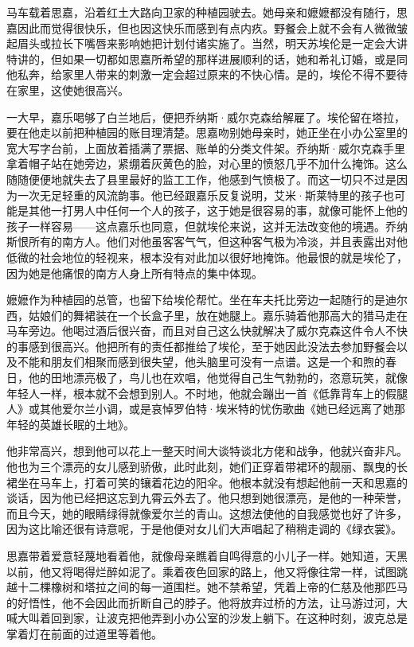 \par  
\par 马车载着思嘉，沿着红土大路向卫家的种植园驶去。她母亲和嬷嬷都没有随行，思嘉因此而觉得很快乐，但也因这快乐而感到有点内疚。野餐会上就不会有人微微皱起眉头或拉长下嘴唇来影响她把计划付诸实施了。当然，明天苏埃伦是一定会大讲特讲的，但如果一切都如思嘉所希望的那样进展顺利的话，她和希礼订婚，或是同他私奔，给家里人带来的刺激一定会超过原来的不快心情。是的，埃伦不得不要待在家里，这使她很高兴。
\par 一大早，嘉乐喝够了白兰地后，便把乔纳斯·威尔克森给解雇了。埃伦留在塔拉，要在他走以前把种植园的账目理清楚。思嘉吻别她母亲时，她正坐在小办公室里的宽大写字台前，上面放着插满了票据、账单的分类文件架。乔纳斯·威尔克森手里拿着帽子站在她旁边，紧绷着灰黄色的脸，对心里的愤怒几乎不加什么掩饰。这么随随便便地就失去了县里最好的监工工作，他感到气愤极了。而这一切只不过是因为一次无足轻重的风流韵事。他已经跟嘉乐反复说明，艾米·斯莱特里的孩子也可能是其他一打男人中任何一个人的孩子，这于她是很容易的事，就像可能怀上他的孩子一样容易——这点嘉乐也同意，但就埃伦来说，这并无法改变他的境遇。乔纳斯恨所有的南方人。他们对他虽客客气气，但这种客气极为冷淡，并且表露出对他低微的社会地位的轻视来，根本没有对此加以很好地掩饰。他最恨的就是埃伦了，因为她是他痛恨的南方人身上所有特点的集中体现。
\par 嬷嬷作为种植园的总管，也留下给埃伦帮忙。坐在车夫托比旁边一起随行的是迪尔西，姑娘们的舞裙装在一个长盒子里，放在她腿上。嘉乐骑着他那高大的猎马走在马车旁边。他喝过酒后很兴奋，而且对自己这么快就解决了威尔克森这件令人不快的事感到很高兴。他把所有的责任都推给了埃伦，至于她因此没法去参加野餐会以及不能和朋友们相聚而感到很失望，他头脑里可没有一点谱。这是一个和煦的春日，他的田地漂亮极了，鸟儿也在欢唱，他觉得自己生气勃勃的，恣意玩笑，就像年轻人一样，根本就不会想到别人。不时地，他就会蹦出一首《低靠背车上的假腿人》或其他爱尔兰小调，或是哀悼罗伯特·埃米特的忧伤歌曲《她已经远离了她那年轻的英雄长眠的土地》。
\par 他非常高兴，想到他可以花上一整天时间大谈特谈北方佬和战争，他就兴奋非凡。他也为三个漂亮的女儿感到骄傲，此时此刻，她们正穿着带裙环的靓丽、飘曳的长裙坐在马车上，打着可笑的镶着花边的阳伞。他根本就没有想起他前一天和思嘉的谈话，因为他已经把这忘到九霄云外去了。他只想到她很漂亮，是他的一种荣誉，而且今天，她的眼睛绿得就像爱尔兰的青山。这想法使他的自我感觉也好了许多，因为这比喻还很有诗意呢，于是他便对女儿们大声唱起了稍稍走调的《绿衣裳》。
\par 思嘉带着爱意轻蔑地看着他，就像母亲瞧着自鸣得意的小儿子一样。她知道，天黑以前，他又将喝得烂醉如泥了。乘着夜色回家的路上，他又将像往常一样，试图跳越十二棵橡树和塔拉之间的每一道围栏。她不禁希望，凭着上帝的仁慈及他那匹马的好悟性，他不会因此而折断自己的脖子。他将放弃过桥的方法，让马游过河，大喊大叫着回到家，让波克把他弄到小办公室的沙发上躺下。在这种时刻，波克总是掌着灯在前面的过道里等着他。
